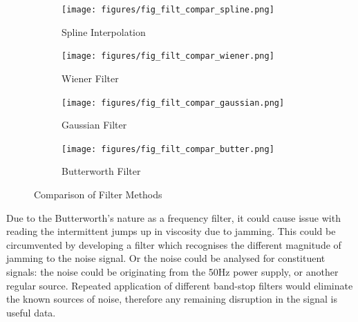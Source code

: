 \documentclass[twoside,a4]{report}
\begin{document}
	\begin{figure}[!htb]
		\centering
		\begin{subfigure}[t]{0.45\textwidth}
			\centering
			\texttt{[image: figures/fig\_filt\_compar\_spline.png]}
			\caption{Spline Interpolation}
			\label{figfiltsp}
			\footnotesize
		\end{subfigure}
		\begin{subfigure}[t]{0.45\textwidth}
			\centering
			\texttt{[image: figures/fig\_filt\_compar\_wiener.png]}
			\caption{Wiener Filter}
			\label{figfiltwi}
			\footnotesize
		\end{subfigure}
		\begin{subfigure}[t]{0.45\textwidth}
			\centering
			\texttt{[image: figures/fig\_filt\_compar\_gaussian.png]}
			\caption{Gaussian Filter}
			\label{figfiltga}
			\footnotesize
		\end{subfigure}
		\begin{subfigure}[t]{0.45\textwidth}
			\centering
			\texttt{[image: figures/fig\_filt\_compar\_butter.png]}
			\caption{Butterworth Filter}
			\label{figfiltbu}
			\footnotesize
		\end{subfigure}
		\caption{Comparison of Filter Methods \label{figfiltcomp}}
	\end{figure}
	
    \noindent
	Due to the Butterworth's nature as a frequency filter, it could cause issue with reading the intermittent jumps up in viscosity due to jamming. This could be circumvented by developing a filter which recognises the different magnitude of jamming to the noise signal. Or the noise could be analysed for constituent signals: the noise could be originating from the 50Hz power supply, or another regular source. Repeated application of different band-stop filters would eliminate the known sources of noise, therefore any remaining disruption in the signal is useful data.

\end{document}
